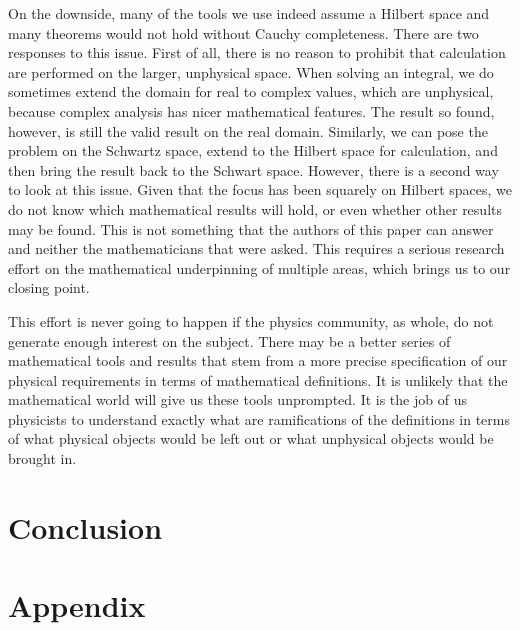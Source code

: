 \documentclass[10pt,twocolumn, nofootinbib]{revtex4-2}
\begin{document}
On the downside, many of the tools we use indeed assume a Hilbert space and many theorems would not hold without Cauchy completeness. There are two responses to this issue. First of all, there is no reason to prohibit that calculation are performed on the larger, unphysical space. When solving an integral, we do sometimes extend the domain for real to complex values, which are unphysical, because complex analysis has nicer mathematical features. The result so found, however, is still the valid result on the real domain. Similarly, we can pose the problem on the Schwartz space, extend to the Hilbert space for calculation, and then bring the result back to the Schwart space. However, there is a second way to look at this issue. Given that the focus has been squarely on Hilbert spaces, we do not know which mathematical results will hold, or even whether other results may be found. This is not something that the authors of this paper can answer and neither the mathematicians that were asked. This requires a serious research effort on the mathematical underpinning of multiple areas, which brings us to our closing point.

This effort is never going to happen if the physics community, as whole, do not generate enough interest on the subject. There may be a better series of mathematical tools and results that stem from a more precise specification of our physical requirements in terms of mathematical definitions. It is unlikely that the mathematical world will give us these tools unprompted. It is the job of us physicists to understand exactly what are ramifications of the definitions in terms of what physical objects would be left out or what unphysical objects would be brought in.

\section{Conclusion}





\newcommand{\pj}[1] {\underbar{$#1$}}

\section*{Appendix}
\end{document}
